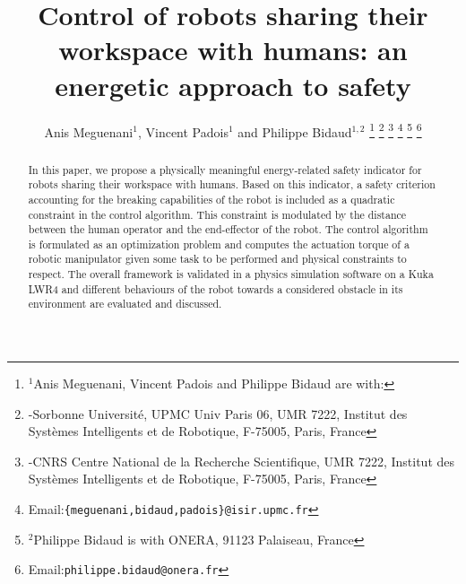 \documentclass[a4paper, 10pt, conference]{ieeeconf}      %
\title{Control of robots sharing their workspace with humans: an energetic approach to safety}
\author{Anis Meguenani$^{1}$, Vincent Padois$^{1}$ and Philippe Bidaud$^{1,2}$ 
\thanks{$^{1}$Anis Meguenani, Vincent Padois and Philippe Bidaud are with:}
\thanks{-Sorbonne Universit\'{e}, UPMC Univ Paris 06, UMR 7222, Institut des Syst\`{e}mes Intelligents et de Robotique, F-75005, Paris, France}
\thanks{-CNRS Centre National de la Recherche Scientifique, UMR 7222, Institut des Syst\`{e}mes Intelligents et de Robotique, F-75005, Paris, France}
\thanks{Email:{\tt\small \{meguenani,bidaud,padois\}@isir.upmc.fr}}
\thanks{$^{2}$Philippe Bidaud is with ONERA, 91123 Palaiseau, France}
\thanks{Email:{\tt\small philippe.bidaud@onera.fr}}}
\begin{document}
\maketitle

\begin{abstract}
In this paper, we propose a physically meaningful energy-related safety indicator for robots sharing their workspace with humans.  Based on this indicator, a safety criterion accounting for the breaking capabilities of the robot is included as a quadratic constraint in the control algorithm. This constraint is modulated by the distance between the human operator and the end-effector of the robot. The control algorithm is formulated as an optimization problem and computes the actuation torque of a robotic manipulator given some task to be performed and physical constraints to respect. The overall framework is validated in a physics simulation software on a Kuka LWR4 and different behaviours of the robot towards a considered obstacle in its environment are evaluated and discussed.

\end{abstract}
\end{document}
